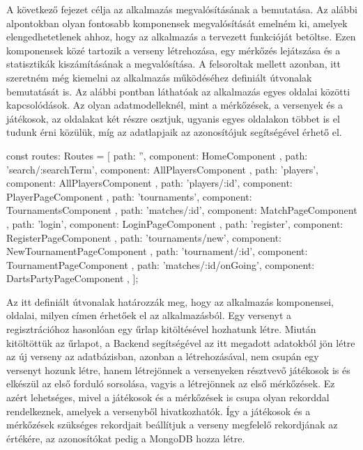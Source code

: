 A következő fejezet célja az alkalmazás megvalósításának a bemutatása. Az alábbi alpontokban olyan fontosabb komponensek megvalósítását emelném ki, amelyek elengedhetetlenek ahhoz, hogy az alkalmazás a tervezett funkcióját betöltse. Ezen komponensek közé tartozik a verseny létrehozása, egy mérkőzés lejátszása és a statisztikák kiszámításának a megvalósítása. A felsoroltak mellett azonban, itt szeretném még kiemelni az alkalmazás működéséhez definiált útvonalak bemutatását is.  
Az alábbi pontban láthatóak az alkalmazás egyes oldalai közötti kapcsolódások. Az olyan adatmodelleknél, mint a mérkőzések, a versenyek és a játékosok, az oldalakat két részre osztjuk, ugyanis egyes oldalakon többet is el tudunk érni közülük, míg az adatlapjaik az azonosítójuk segítségével érhető el.
\begin{cpp}
const routes: Routes = [
  { path: '', component: HomeComponent },
  { path: 'search/:searchTerm', component: AllPlayersComponent },
  { path: 'players', component: AllPlayersComponent },
  { path: 'players/:id', component: PlayerPageComponent },
  { path: 'tournaments', component: TournamentsComponent },
  { path: 'matches/:id', component: MatchPageComponent },
  { path: 'login', component: LoginPageComponent },
  { path: 'register', component: RegisterPageComponent },
  { path: 'tournaments/new', component: NewTournamentPageComponent },
  { path: 'tournament/:id', component: TournamentPageComponent },
  { path: 'matches/:id/onGoing', component: DartsPartyPageComponent },
];
\end{cpp}
Az itt definiált útvonalak határozzák meg, hogy az alkalmazás komponensei, oldalai, milyen címen érhetőek el az alkalmazásból.
Egy versenyt a regisztrációhoz hasonlóan egy űrlap kitöltésével hozhatunk létre. Miután kitöltöttük az űrlapot, a Backend segítségével az itt megadott adatokból jön létre az új verseny az adatbázisban, azonban a létrehozásával, nem csupán egy versenyt hozunk létre, hanem létrejönnek a versenyeken résztvevő játékosok is és elkészül az első forduló sorsolása, vagyis a létrejönnek az első mérkőzések. Ez azért lehetséges, mivel a játékosok és a mérkőzések is csupa olyan rekorddal rendelkeznek, amelyek a versenyből hivatkozhatók. Így a játékosok és a mérkőzések szükséges rekordjait beállítjuk a verseny megfelelő rekordjának az értékére, az azonosítókat pedig a MongoDB hozza létre.

